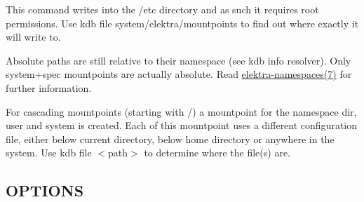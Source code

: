 This command writes into the {\ttfamily /etc} directory and as such it requires root permissions. Use {\ttfamily kdb file system/elektra/mountpoints} to find out where exactly it will write to.

Absolute paths are still relative to their namespace (see {\ttfamily kdb info resolver}). Only system+spec mountpoints are actually absolute. Read \hyperlink{md_doc_help_elektra-namespaces_doc_help_elektra-namespaces_md}{elektra-\/namespaces(7)} for further information.

For cascading mountpoints (starting with {\ttfamily /}) a mountpoint for the namespace {\ttfamily dir}, {\ttfamily user} and {\ttfamily system} is created. Each of this mountpoint uses a different configuration file, either below current directory, below home directory or anywhere in the system. Use {\ttfamily kdb file $<$path$>$} to determine where the file(s) are.

\subsection*{O\+P\+T\+I\+O\+NS}


